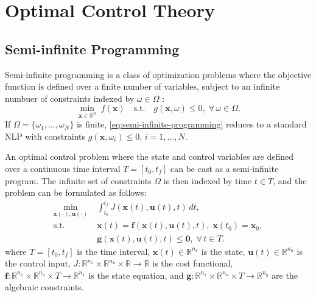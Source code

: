 


\section{Optimal Control Theory}
\subsection{Semi-infinite Programming}\label{sec:semi-infinite-programming}

Semi-infinite programming is a class of optimization problems where the objective function is defined over a finite number of variables, subject to an infinite numbuer of constraints  indexed by $\omega\in\Omega$ \citep{Bonnans2013-gt}:
\begin{equation}\label{eq:semi-infinite-programming}
  \min_{\mathbf x\in\mathbb R^n}\; f(\mathbf x)
  \quad\text{s.t.}\quad g(\mathbf x,\omega)\le0,\;\forall\,\omega\in\Omega.
\end{equation}
If $\Omega=\{\omega_1,\dots,\omega_N\}$ is finite, \eqref{eq:semi-infinite-programming} reduces to a standard \acrfull{NLP} with constraints $g(\mathbf x,\omega_i)\le0$, $i=1,\dots,N$.

An optimal control problem where the state and control variables are defined over a continuous time interval $T=[t_0,t_f]$ can be cast as a semi-infinite program.  The infinite set of constraints $\Omega$ is then indexed by time $t\in T$, and the problem can be formulated as follows:
\begin{equation}\label{eq:optimal-control-problem}
  \begin{aligned}
    \min_{\mathbf{x}(\cdot),\mathbf{u}(\cdot)}\;&\int_{t_0}^{t_f}J(\mathbf x(t),\mathbf u(t),t)\,dt,\\
    \text{s.t.}\;&\dot{\mathbf x}(t)=\mathbf f(\mathbf x(t),\mathbf u(t),t),\;\mathbf x(t_0)=\mathbf x_0,\\
                &\mathbf g(\mathbf x(t),\mathbf u(t),t)\le\mathbf 0,\;\forall\,t\in T.
  \end{aligned}
\end{equation}
where $T = [t_0, t_f]$ is the time interval, $\mathbf{x}(t) \in \mathbb R^{n_x}$ is the state, $\mathbf{u}(t) \in \mathbb R^{n_u}$ is the control input, $J : \mathbb R^{n_x} \times \mathbb R^{n_u} \times \mathbb R \to \mathbb R$ is the cost functional, $\mathbf f : \mathbb R^{n_x} \times \mathbb R^{n_u} \times T \to \mathbb R^{n_x}$ is the state equation, and $\mathbf g : \mathbb R^{n_x} \times \mathbb R^{n_u} \times T \to \mathbb R^{n_g}$ are the algebraic constraints. 



